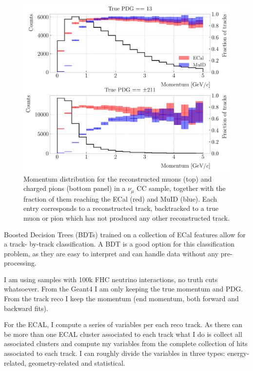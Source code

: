 \begin{figure}[t]
	\centering
	\includegraphics[width=.80\linewidth]{Images/GArSoft_PID/BDT/fraction_vs_preco_no_duplicates.pdf}
	\caption{Momentum distribution for the reconstructed muons (top) and charged pions (bottom panel) in a $\nu_{\mu}$ CC sample, together with the fraction of them reaching the ECal (red) and MuID (blue). Each entry corresponds to a reconstructed track, backtracked to a true muon or pion which has not produced any other reconstructed track.}
	\label{fig:fraction_particles_ecal_muid}
\end{figure}

Boosted Decision Trees (BDTs) trained on a collection of ECal features allow for a track- by-track classification. A BDT is a good option for this classification problem, as they are easy to interpret and can handle data without any pre-processing.

I am using samples with 100k FHC neutrino interactions, no truth cuts whatsoever. From the Geant4 I am only keeping the true momentum and PDG. From the track reco I keep the momentum (end momentum, both forward and backward fits).

For the ECAL, I compute a series of variables per each reco track. As there can be more than one ECAL cluster associated to each track what I do is collect all associated clusters and compute my variables from the complete collection of hits associated to each track. I can roughly divide the variables in three types: energy-related, geometry-related and statistical.

